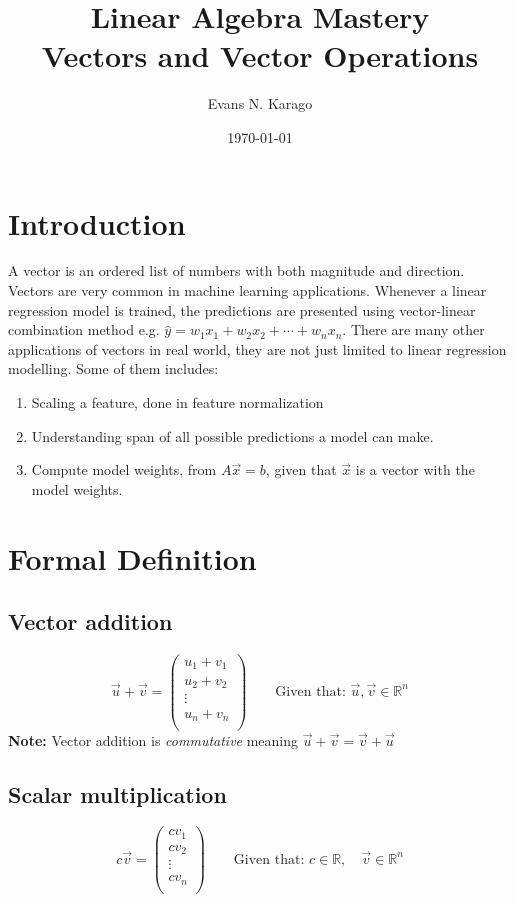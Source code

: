 \documentclass[11pt]{article}
\title{Linear Algebra Mastery \\ \large Vectors and Vector Operations}
\author{Evans N. Karago}
\date{\today}
\begin{document}
\maketitle
	\section{Introduction}
		A vector is an ordered list of  numbers with both magnitude and direction. Vectors are very common in machine learning applications. Whenever a linear regression model is trained, the predictions are presented using vector-linear combination method e.g. $\hat y = w_1x_1 + w_2x_2 + \cdots + w_nx_n$. There are many other applications of vectors in real world, they are not just limited to linear regression modelling.  Some of them includes:
		\begin{enumerate}
			\item Scaling a feature, done in feature normalization
			\item Understanding span of all possible predictions a model can make. 
			\item Compute model weights, from $A\vec x = b$, given that $\vec x$ is a vector with the model weights. 
		\end{enumerate}
	
	\section{Formal Definition}
	\subsection{Vector addition}
	
	\[
		\vec u + \vec v = \begin{pmatrix}
		u_1 + v_1\\
		u_2+ v_2\\
		\vdots \\
		u_n + v_n\\
\end{pmatrix} \qquad 
\text{Given that: } \vec u , \vec v \in \mathbb{R}^n			
	\]
	\textbf{Note: } Vector addition is \textit{commutative} meaning $\vec u + \vec v = \vec v + \vec u$\\[0.15in]
	\subsection{Scalar multiplication}
	\[
	c\vec v = 
	\begin{pmatrix}
		cv_1 \\
		cv_2\\
		\vdots \\
		cv_n\\
	\end{pmatrix}	\qquad
	\text{Given that: } c \in \mathbb{R}, \quad \vec v \in \mathbb{R}^n
	\]
\end{document}
